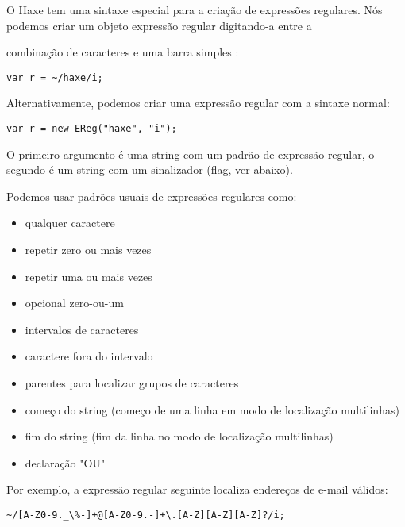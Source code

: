     O Haxe tem uma sintaxe especial para a criação de expressões regulares. Nós podemos criar um objeto expressão regular digitando-a entre a {combinação de caracteres \expr{\textasctilde/} e uma barra simples \expr{/}:

\begin{lstlisting}
var r = ~/haxe/i;
\end{lstlisting}

Alternativamente, podemos criar uma expressão regular com a sintaxe normal:

\begin{lstlisting}
var r = new EReg("haxe", "i");
\end{lstlisting}

O primeiro argumento é uma string com um padrão de expressão regular, o segundo é um string com um sinalizador (flag, ver abaixo).

Podemos usar padrões usuais de expressões regulares como:
\begin{itemize}
    \item {} qualquer caractere
    \item \expr{*} repetir zero ou mais vezes
    \item \expr{+} repetir uma ou mais vezes
    \item {} opcional zero-ou-um
    \item \expr{[A-Z0-9]} intervalos de caracteres
  	\item {} caractere fora do intervalo
    \item {} parentes para localizar grupos de caracteres
	\item \expr{\textasciicircum} começo do string (começo de uma linha em modo de localização multilinhas)
	\item \expr{\$}fim do string (fim da linha no modo de localização multilinhas)
    \item \expr{|}declaração "OU"
\end{itemize}


Por exemplo, a expressão regular seguinte localiza endereços de e-mail válidos:
\begin{lstlisting}
~/[A-Z0-9._\%-]+@[A-Z0-9.-]+\.[A-Z][A-Z][A-Z]?/i;
\end{lstlisting}

}

